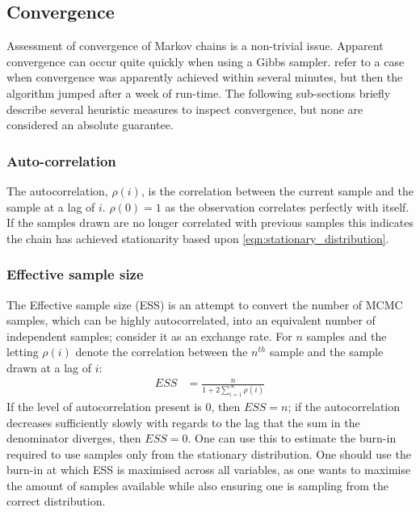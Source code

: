\documentclass[12pt]{article} %
\begin{document}
	\subsection{Convergence}
	Assessment of convergence of Markov chains is a non-trivial issue. Apparent convergence can occur quite quickly when using a Gibbs sampler. \citet{ripley1990iterative} refer to a case when convergence was apparently achieved within several minutes, but then the algorithm jumped after a week of run-time. The following sub-sections briefly describe several heuristic measures to inspect convergence, but none are considered an absolute guarantee.
	
	\subsubsection{Auto-correlation} \label{sec:additional_theory:sub_sec:convergence:sub_sub_sec:autocorrelation}
	The autocorrelation, $\rho(i)$, is the correlation between the current sample and the sample at a lag of $i$. $\rho(0)=1$ as the observation correlates perfectly with itself. If the samples drawn are no longer correlated with previous samples this indicates the chain has achieved stationarity based upon \eqref{eqn:stationary_distribution}.
	
	\subsubsection{Effective sample size} \label{sec:additional_theory:sub_sec:convergence:sub_sub_sec:ess}
	The Effective sample size (ESS) \citep{ripley2009stochastic} is an attempt to convert the number of MCMC samples, which can be highly autocorrelated, into an equivalent number of independent samples; consider it as an exchange rate. For $n$ samples and the letting $\rho(i)$ denote the correlation between the $n^{th}$ sample and the sample drawn at a lag of $i$:
	\begin{align} \label{eqn:effective_smaple_size}
	ESS &= \frac{n}{1 + 2 \sum_{i=1}^\infty \rho(i)}
	\end{align}
	If the level of autocorrelation present is 0, then $ESS=n$;  if the autocorrelation decreases sufficiently slowly with regards to the lag that the sum in the denominator diverges, then $ESS=0$. One can use this to estimate the burn-in required to use samples only from the stationary distribution. One should use the burn-in at which ESS is maximised across all variables, as one wants to maximise the amount of samples available  while also ensuring one is sampling from the correct distribution.
		
\end{document}
